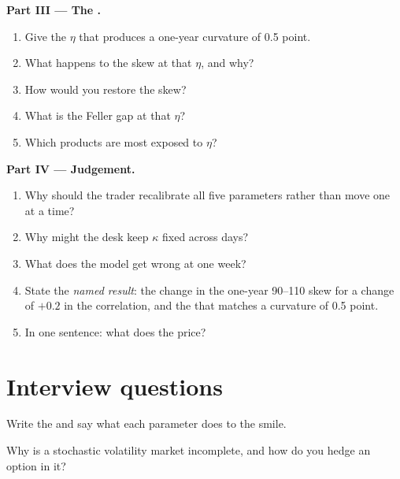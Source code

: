 \begin{problem}
\medskip\noindent\textbf{Part III --- The .}
\begin{enumerate}[resume]
\item Give the $\eta$ that produces a one-year curvature of 0.5 point.
\item What happens to the skew at that $\eta$, and why?
\item How would you restore the skew?
\item What is the Feller gap at that $\eta$?
\item Which products are most exposed to $\eta$?
\end{enumerate}

\medskip\noindent\textbf{Part IV --- Judgement.}
\begin{enumerate}[resume]
\item Why should the trader recalibrate all five parameters rather than move one at a time?
\item Why might the desk keep $\kappa$ fixed across days?
\item What does the model get wrong at one week?
\item State the \emph{named result}: the change in the one-year 90--110 skew for a change of $+0.2$ in the correlation,
and the  that matches a curvature of 0.5 point.
\item In one sentence: what does the  price?
\end{enumerate}
\end{problem}

\section{Interview questions}

\begin{interviewq}\label{iq:dv:stochastic-volatility:1}
Write the  and say what each parameter does to the smile.
\end{interviewq}

\begin{interviewq}\label{iq:dv:stochastic-volatility:2}
Why is a stochastic volatility market incomplete, and how do you hedge an option in it?
\end{interviewq}

